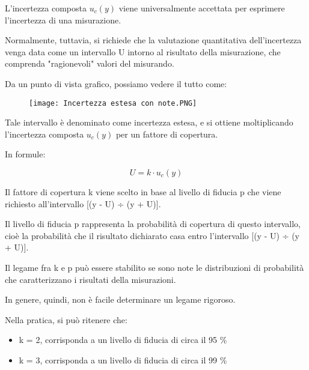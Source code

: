 L'incertezza composta $u_c (y)$ viene universalmente accettata per esprimere l'incertezza di una misurazione. \newline 

Normalmente, tuttavia, si richiede che la valutazione quantitativa dell'incertezza venga data come un intervallo U intorno al risultato della misurazione, 
che comprenda "ragionevoli" valori del misurando. \newline 

Da un punto di vista grafico, possiamo vedere il tutto come: 

\begin{figure}[h]
    \centering
    \texttt{[image: Incertezza estesa con note.PNG]}
\end{figure}

Tale intervallo è denominato come incertezza estesa, 
e si ottiene moltiplicando l'incertezza composta $u_c (y)$ per un fattore di copertura. \newline 

In formule: 

{
    \Large 
    \begin{equation}
        U = k \cdot u_c (y)
    \end{equation}
}

Il fattore di copertura k viene scelto in base al livello di fiducia p che viene 
richiesto all'intervallo [(y - U) ÷ (y + U)]. \newline 

Il livello di fiducia p rappresenta la probabilità di copertura di questo intervallo, 
cioè la probabilità che il risultato dichiarato casa entro l'intervallo [(y - U) ÷ (y + U)]. \newline 

Il legame fra k e p può essere stabilito se sono note le distribuzioni di probabilità 
che caratterizzano i risultati della misurazioni. \newline 

In genere, quindi, non è facile determinare un legame rigoroso. \newline 

Nella pratica, si può ritenere che: 

\begin{itemize}
    \item k = 2, corrisponda a un livello di fiducia di circa il 95 \% 
    \item k = 3, corrisponda a un livello di fiducia di circa il 99 \%
\end{itemize}

